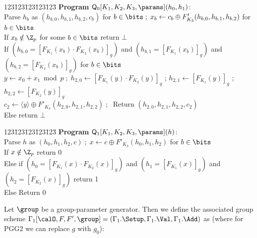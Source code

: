  \begin{center}
\begin{minipage}{1in}
\begin{tabbing}
123\=123\=123\=123\=123\=\kill
\textbf{Program} $\mathsf{Q}_0[K_1, K_2, K_3,\params](h_0,h_1)$: \\
\> Parse $h_b$ as $(h_{b,0},h_{b,1},h_{b,2},c_b)$ for $b \in \bits \;;\; x_b \gets c_b \oplus F'_{K_3}(h_{b,0},  h_{b,1},  h_{b,2})$ for $b \in \bits$ \\
\> If $x_b \notin \Z_p$  for some $b\in\bits$ return $\bot$ \\
\> If $(h_{b,0} = [F_{K_1}(x_b) \cdot F_{K_2}(x_b)]_{g})$ and $(h_{b,1} = [F_{K_1}(x_b)]_{g})$ and $(h_{b,2} = [F_{K_2}(x_b)]_{g})$ for $b \in \bits$ \\
\>\> $y \gets x_0 + x_1 \bmod p \; ; \; h_{2,0} \gets [F_{K_1}(y) \cdot F_{K_2}(y)]_{g}$ \;;\; $h_{2,1} \gets [F_{K_1}(y)]_{g}$ \;;\; $h_{2,2} \gets [F_{K_2}(y)]_{g}$ \\
\>\> $c_2 \gets  \langle y \rangle  \oplus F'_{K_3}(h_{2,0}, h_{2,1}, h_{2,2}) \;;\;$ Return $(h_{2,0},h_{2,1},h_{2,2},c_2)$ \\
\> Else return $\bot$\\
\end{tabbing} \end{minipage}

\begin{minipage}{1in}
\begin{tabbing}
123\=123\=123\=123\=123\=\kill
\textbf{Program} $\mathsf{Q}_1[K_1, K_2, K_3,\params](h)$: \\
\> Parse $h$ as $(h_{0},h_{1},h_{2},c) \; ; \; x \gets c \oplus F'_{K_3}(h_{0}, h_{1}, h_{2})$ for $b \in \bits$ \\
\> If  $x \notin \Z_p$ return 0 \\
\> Else if $(h_{0} = [F_{K_1}(x) \cdot F_{K_2}(x)]_{g})$ and $(h_{1} = [F_{K_1}(x)]_{g})$ and $(h_{2} = [F_{K_2}(x)]_{g})$ return 1 \\
\> Else Return 0 \\
\end{tabbing} \end{minipage}
\end{center}
\vspace{-2mm}
\noindent 
Let $\group$ be a group-parameter generator. 
Then we define the associated group scheme  $\Gamma_1[\calO,F,F',\group] = (\Gamma_1.\Setup,\Gamma_1.\Val,\Gamma_1.\Add)$ as (where  for PGG2 we can replace $g$ with $g_0$):
